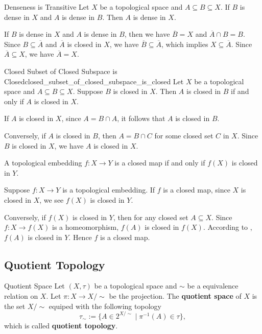 \documentclass{report}
\begin{document}
\begin{proposition}{Denseness is Transitive}{}
	Let $X$ be a topological space and $A\subseteq B\subseteq X$. If $B$ is dense in $X$ and $A$ is dense in $B$. Then $A$ is dense in $X$.
\end{proposition}
\begin{prf}
	If $B$ is dense in $X$ and $A$ is dense in $B$, then we have $\overline{B}=X$ and $\overline{A}\cap B=B$. Since $B\subseteq \overline{A}$ and $\overline{A}$ is closed in $X$, we have $\overline{B}\subseteq \overline{A}$, which implies $X\subseteq \overline{A}$. Since $\overline{A}\subseteq X$, we have $\overline{A}=X$.
\end{prf}


\begin{proposition}{Closed Subset of Closed Subspace is Closed}{closed_subset_of_closed_subspace_is_closed}
	Let $X$ be a topological space and $A\subseteq B\subseteq X$. Suppose $B$ is closed in $X$. Then $A$ is closed in $B$ if and only if $A$ is closed in $X$.
\end{proposition}
\begin{prf}
	If $A$ is closed in $X$, since $A=B \cap A$, it follows that $A$ is closed in $B$.
	
	Conversely, if $A$ is closed in $B$, then $A=B\cap C$ for some closed set $C$ in $X$. Since $B$ is closed in $X$, we have $A$ is closed in $X$.
\end{prf}


\begin{proposition}{}{}
	A topological embedding $f:X\to Y$ is a closed map if and only if $f(X)$ is closed in $Y$.
\end{proposition}
\begin{prf}
	Suppose $f:X\to Y$ is a topological embedding. If $f$ is a closed map, since $X$ is closed in $X$, we see $f(X)$ is closed in $Y$.

	Conversely, if $f(X)$ is closed in $Y$, then for any closed set $A\subseteq X$. Since $f:X\to f(X)$ is a homeomorphism, $f(A)$ is closed in $f(X)$. According to , $f(A)$ is closed in $Y$. Hence $f$ is a closed map.
\end{prf}

\subsection{Quotient Topology}
\begin{definition}{Quotient Space}{}
	Let $(X,\tau)$ be a topological space and $\sim$ be a equivalence relation on $X$. Let $\pi:X\to X/\sim$ be the projection.
	The \textbf{quotient space} of $X$ is the set $X/\sim$ equiped with the following topology
	\[
		\tau_\sim:=\{A\in 2^{X/\sim}\mid \pi^{-1}(A)\in \tau\},
	\]
	which is called \textbf{quotient topology}.
\end{definition}
\end{document}
